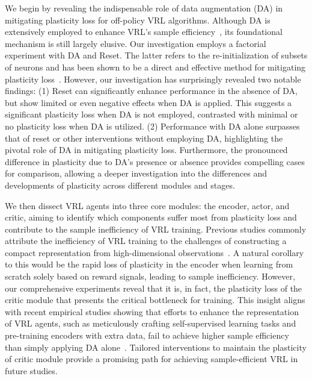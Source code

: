 We begin by revealing the indispensable role of data augmentation (DA) in mitigating plasticity loss for off-policy VRL algorithms.
Although DA is extensively employed to enhance VRL's sample efficiency~\citep{drq, DrQ-v2}, its foundational mechanism is still largely elusive.
Our investigation employs a factorial experiment with DA and Reset.
The latter refers to the re-initialization of subsets of neurons and has been shown to be a direct and effective method for mitigating plasticity loss~\citep{primacy_bias}.
However, our investigation has surprisingly revealed two notable findings:
(1) Reset can significantly enhance performance in the absence of DA, but show limited or even negative effects when DA is applied.
This suggests a significant plasticity loss when DA is not employed, contrasted with minimal or no plasticity loss when DA is utilized.
(2) Performance with DA alone surpasses that of reset or other interventions without employing DA, highlighting the pivotal role of DA in mitigating plasticity loss. 
Furthermore, the pronounced difference in plasticity due to DA's presence or absence provides compelling cases for comparison, allowing a deeper investigation into the differences and developments of plasticity across different modules and stages.

We then dissect VRL agents into three core modules: the encoder, actor, and critic, aiming to identify which components suffer most from plasticity loss and contribute to the sample inefficiency of VRL training.
Previous studies commonly attribute the inefficiency of VRL training to the challenges of constructing a compact representation from high-dimensional observations~\citep{tomar2021learning, CURL, wang2022vrl3, ATC, RRL}.
A natural corollary to this would be the rapid loss of plasticity in the encoder when learning from scratch solely based on reward signals, leading to sample inefficiency.
However, our comprehensive experiments reveal that it is, in fact, the plasticity loss of the critic module that presents the critical bottleneck for training.
This insight aligns with recent empirical studies showing that efforts to enhance the representation of VRL agents, such as meticulously crafting self-supervised learning tasks and pre-training encoders with extra data, fail to achieve higher sample efficiency than simply applying DA alone~\citep{Does_SSL,Learning-from-Scratch}.
Tailored interventions to maintain the plasticity of critic module provide a promising path for achieving sample-efficient VRL in future studies.


